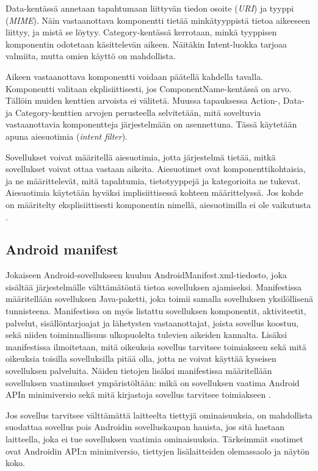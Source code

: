 Data-kentässä annetaan tapahtumaan liittyvän tiedon osoite (\emph{URI}) ja tyyppi (\emph{MIME}). Näin vastaanottava komponentti tietää minkätyyppistä tietoa aikeeseen liittyy, ja mistä se löytyy. Category-kentässä kerrotaan, minkä tyyppisen komponentin odotetaan käsittelevän aikeen. Näitäkin Intent-luokka tarjoaa valmiita, mutta omien käyttö on mahdollista.

Aikeen vastaanottava komponentti voidaan päätellä kahdella tavalla. Komponentti valitaan ekplisiittisesti, jos ComponentName-kentässä on arvo. Tällöin muiden kenttien arvoista ei välitetä. Muussa tapauksessa Action-, Data- ja Category-kenttien arvojen perusteella selvitetään, mitä soveltuvia vastaanottavia komponentteja järjestelmään on asennettuna. Tässä käytetään apuna aiesuotimia (\emph{intent filter}).

Sovellukset voivat määritellä aiesuotimia, jotta järjestelmä tietää, mitkä sovellukset voivat ottaa vastaan aikeita. Aiesuotimet ovat komponenttikohtaisia, ja ne määrittelevät, mitä tapahtumia, tietotyyppejä ja kategorioita ne tukevat. Aiesuotimia käytetään hyväksi implisiittisessä kohteen määrittelyssä. Jos kohde on määritelty eksplisiittisesti komponentin nimellä, aiesuotimilla ei ole vaikutusta \cite{android}.

\subsection{Android manifest}

Jokaiseen Android-sovellukseen kuuluu AndroidManifest.xml-tiedosto, joka sisältää järjestelmälle välttämätöntä tietoa sovelluksen ajamiseksi. Manifestissa määritellään sovelluksen Java-paketti, joka toimii samalla sovelluksen yksilöllisenä tunnisteena. Manifestissa on myös listattu sovelluksen komponentit, aktiviteetit, palvelut, sisällöntarjoajat ja lähetysten vastaanottajat, joista sovellus koostuu, sekä niiden toiminnallisuus ulkopuolelta tulevien aikeiden kannalta. Lisäksi manifestissa ilmoitetaan, mitä oikeuksia sovellus tarvitsee toimiakseen sekä mitä oikeuksia toisilla sovelluksilla pitää olla, jotta ne voivat käyttää kyseisen sovelluksen palveluita. Näiden tietojen lisäksi manifestissa määritellään sovelluksen vaatimukset ympäristöltään: mikä on sovelluksen vaatima Android APIn minimiversio sekä mitä kirjastoja sovellus tarvitsee toimiakseen \cite{android}.

Jos sovellus tarvitsee välttämättä laitteelta tiettyjä ominaisuuksia, on mahdollista suodattaa sovellus pois Androidin sovelluskaupan hauista, jos sitä haetaan laitteella, joka ei tue sovelluksen vaatimia ominaisuuksia. Tärkeimmät suotimet ovat Androidin API:n minimiversio, tiettyjen lisälaitteiden olemassaolo ja näytön koko.

